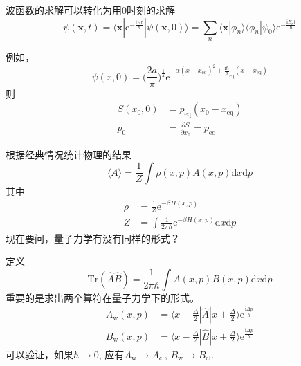 \documentclass[12pt]{article}
\begin{document}
波函数的求解可以转化为用0时刻的求解
\begin{equation*}
    \psi(\bm{x},t) = \langle \bm{x} | \mathrm{e}^{-\frac {\mathrm{i}\hat{H}t}{\hbar}} | \psi(\bm{x},0) \rangle = \sum_n \langle \bm{x}|\phi_n \rangle \langle \phi_n |\psi_0 \rangle \mathrm{e}^{-\frac {\mathrm{i}E_n t}{\hbar}}
\end{equation*}

例如，
\begin{equation*}
    \psi(x,0) =  \bigg(\frac {2a}{\pi}\bigg)^{\frac 14} \mathrm{e}^{-\alpha (x - x_{\mathrm{eq}})^2 +\frac {\mathrm{i}{\hbar}} p_{\mathrm{eq}}(x - x_\mathrm{eq})}
\end{equation*}
则
\begin{align*}
    S(x_0,0) &= p_\mathrm{eq} (x_0 - x_\mathrm{eq})\\
    p_0 &= \frac {\partial S}{\partial x_0} = p_\mathrm{eq}
\end{align*}

根据经典情况统计物理的结果
\begin{equation*}
    \langle A \rangle =\frac 1Z \int \rho(x,p)A(x,p) \mathrm{d}x\mathrm{d}p
\end{equation*}
其中 
\begin{align*}
    \rho &= \frac 1Z \mathrm{e}^{-\beta H(x,p)}\\
    Z &= \int \frac 1{2\pi \hbar} \mathrm{e}^{-\beta H(x,p)} \mathrm{d}x \mathrm{d}p
\end{align*}
现在要问，量子力学有没有同样的形式？

定义
\begin{equation*}
    \mathrm{Tr} (\hat{A}\hat{B}) = \frac 1{2\pi\hbar}\int A(x,p)B(x,p) \mathrm{d}x \mathrm{d}p
\end{equation*}
重要的是求出两个算符在量子力学下的形式。
\begin{align*}
    A_\mathrm{w}(x,p) &= \langle x - \frac {\Delta}2 | \hat{A} | x + \frac {\Delta}2 \rangle \mathrm{e}^{\frac {\mathrm{i}\Delta p}{\hbar}}\\
    B_\mathrm{w}(x,p) &= \langle x - \frac {\Delta}2 | \hat{B} | x + \frac {\Delta}2 \rangle \mathrm{e}^{\frac {\mathrm{i}\Delta p}{\hbar}}
\end{align*}
可以验证，如果$\hbar \to 0$, 应有$A_\mathrm{w} \to A_\mathrm{cl}$, $B_\mathrm{w} \to B_\mathrm{cl}$. 
\end{document}
